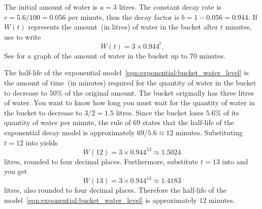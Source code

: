 \documentclass[a4paper,oneside,12pt]{article}
\begin{document}
\begin{solution}
The initial amount of water is $a = 3$ litres.  The constant decay
rate is $r = 5.6 / 100 = 0.056$ per minute, thus the decay factor is
$b = 1 - 0.056 = 0.944$.  If $W(t)$ represents the amount~(in litres)
of water in the bucket after $t$ minutes, use
 to write
\begin{equation}
\label{eqn:exponential:bucket_water_level}
W(t)
=
3 \times 0.944^t.
\end{equation}
See  for a graph of the
amount of water in the bucket up to $70$ minutes.

The half-life of the exponential
model~\eqref{eqn:exponential:bucket_water_level} is the amount of
time~(in minutes) required for the quantity of water in the bucket to
decrease to $50\%$ of the original amount.  The bucket originally has
three litres of water.  You want to know how long you must wait for
the quantity of water in the bucket to decrease to $3 / 2 = 1.5$
litres.  Since the bucket loses $5.6\%$ of its quantity of water per
minute, the rule of $69$ states that the half-life of the exponential
decay model is approximately $69 / 5.6 \approx 12$ minutes.
Substituting $t = 12$ into
 yields
\[
W(12)
=
3 \times 0.944^{12}
\approx
1.5024
\]
litres, rounded to four decimal places.  Furthermore, substitute
$t = 13$ into  and you get
\[
W(13)
=
3 \times 0.944^{13}
\approx
1.4183
\]
litres, also rounded to four decimal places.  Therefore the half-life
of the model~\eqref{eqn:exponential:bucket_water_level} is
approximately $12$ minutes.
\end{solution}
\end{document}
